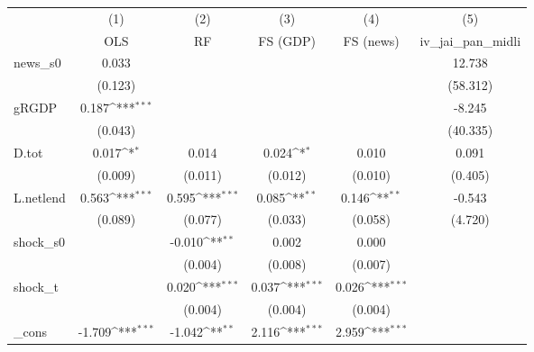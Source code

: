 {
\def\sym#1{\ifmmode^{#1}\else\(^{#1}\)\fi}
\begin{tabular}{l*{5}{c}}
\toprule
            &\multicolumn{1}{c}{(1)}&\multicolumn{1}{c}{(2)}&\multicolumn{1}{c}{(3)}&\multicolumn{1}{c}{(4)}&\multicolumn{1}{c}{(5)}\\
            &\multicolumn{1}{c}{OLS}&\multicolumn{1}{c}{RF}&\multicolumn{1}{c}{FS (GDP)}&\multicolumn{1}{c}{FS (news)}&\multicolumn{1}{c}{iv\_jai\_pan\_midli}\\
\midrule
news\_s0     &       0.033         &                     &                     &                     &      12.738         \\
            &     (0.123)         &                     &                     &                     &    (58.312)         \\
\addlinespace
gRGDP       &       0.187\sym{***}&                     &                     &                     &      -8.245         \\
            &     (0.043)         &                     &                     &                     &    (40.335)         \\
\addlinespace
D.tot       &       0.017\sym{*}  &       0.014         &       0.024\sym{*}  &       0.010         &       0.091         \\
            &     (0.009)         &     (0.011)         &     (0.012)         &     (0.010)         &     (0.405)         \\
\addlinespace
L.netlend   &       0.563\sym{***}&       0.595\sym{***}&       0.085\sym{**} &       0.146\sym{**} &      -0.543         \\
            &     (0.089)         &     (0.077)         &     (0.033)         &     (0.058)         &     (4.720)         \\
\addlinespace
shock\_s0    &                     &      -0.010\sym{**} &       0.002         &       0.000         &                     \\
            &                     &     (0.004)         &     (0.008)         &     (0.007)         &                     \\
\addlinespace
shock\_t     &                     &       0.020\sym{***}&       0.037\sym{***}&       0.026\sym{***}&                     \\
            &                     &     (0.004)         &     (0.004)         &     (0.004)         &                     \\
\addlinespace
\_cons      &      -1.709\sym{***}&      -1.042\sym{**} &       2.116\sym{***}&       2.959\sym{***}&                     \\

\end{tabular}}
